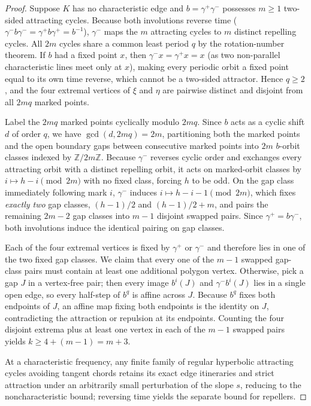 \documentclass[11pt,reqno]{amsart}
\theoremstyle{definition}
\theoremstyle{remark}
\newcommand{\Z}{\mathbb{Z}}
\begin{document}
\begin{proof}
Suppose $K$ has no characteristic edge and $b = \gamma^+\gamma^-$ possesses $m \ge 1$ two-sided attracting cycles. Because both involutions reverse time ($\gamma^- b \gamma^- = \gamma^+ b \gamma^+ = b^{-1}$), $\gamma^-$ maps the $m$ attracting cycles to $m$ distinct repelling cycles. All $2m$ cycles share a common least period $q$ by the rotation-number theorem. If $b$ had a fixed point $x$, then $\gamma^- x = \gamma^+ x = x$ (as two non-parallel characteristic lines meet only at $x$), making every periodic orbit a fixed point equal to its own time reverse, which cannot be a two-sided attractor. Hence $q \ge 2$, and the four extremal vertices of $\xi$ and $\eta$ are pairwise distinct and disjoint from all $2mq$ marked points.

Label the $2mq$ marked points cyclically modulo $2mq$. Since $b$ acts as a cyclic shift $d$ of order $q$, we have $\gcd(d, 2mq) = 2m$, partitioning both the marked points and the open boundary gaps between consecutive marked points into $2m$ $b$-orbit classes indexed by $\Z/2m\Z$. Because $\gamma^-$ reverses cyclic order and exchanges every attracting orbit with a distinct repelling orbit, it acts on marked-orbit classes by $i \mapsto h - i \pmod{2m}$ with no fixed class, forcing $h$ to be odd. On the gap class immediately following mark $i$, $\gamma^-$ induces $i \mapsto h - i - 1 \pmod{2m}$, which fixes \emph{exactly two} gap classes, $(h-1)/2$ and $(h-1)/2 + m$, and pairs the remaining $2m - 2$ gap classes into $m-1$ disjoint swapped pairs. Since $\gamma^+ = b\gamma^-$, both involutions induce the identical pairing on gap classes.

Each of the four extremal vertices is fixed by $\gamma^+$ or $\gamma^-$ and therefore lies in one of the two fixed gap classes. We claim that every one of the $m-1$ swapped gap-class pairs must contain at least one additional polygon vertex. Otherwise, pick a gap $J$ in a vertex-free pair; then every image $b^i(J)$ and $\gamma^- b^i(J)$ lies in a single open edge, so every half-step of $b^q$ is affine across $J$. Because $b^q$ fixes both endpoints of $J$, an affine map fixing both endpoints is the identity on $J$, contradicting the attraction or repulsion at its endpoints. Counting the four disjoint extrema plus at least one vertex in each of the $m-1$ swapped pairs yields $k \ge 4 + (m-1) = m+3$.

At a characteristic frequency, any finite family of regular hyperbolic attracting cycles avoiding tangent chords retains its exact edge itineraries and strict attraction under an arbitrarily small perturbation of the slope $s$, reducing to the noncharacteristic bound; reversing time yields the separate bound for repellers.


\end{proof}
\end{document}
